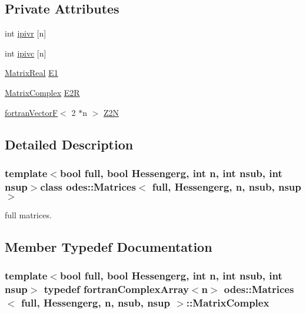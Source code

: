 \subsection*{Private Attributes}
\begin{DoxyCompactItemize}
\item 
int \hyperlink{classodes_1_1Matrices_ac7c747721a0d2ca7f9b792f25ce07ea9}{ipivr} \mbox{[}n\mbox{]}
\item 
int \hyperlink{classodes_1_1Matrices_a32b17a76a3380307a8fe5e6aa1395e4a}{ipivc} \mbox{[}n\mbox{]}
\item 
\hyperlink{classodes_1_1Matrices_aa028f1e52916558a51d333ac8b081030}{Matrix\+Real} \hyperlink{classodes_1_1Matrices_afba5034652d2298f7f8ad01468a1bdbd}{E1}
\item 
\hyperlink{classodes_1_1Matrices_aa1313b5ab7fdab6f5320c8d5aa3bfc24}{Matrix\+Complex} \hyperlink{classodes_1_1Matrices_a62ad6fe606146f2957ff8d428da1867d}{E2\+R}
\item 
\hyperlink{classodes_1_1fortranVectorF}{fortran\+Vector\+F}$<$ 2 $\ast$n $>$ \hyperlink{classodes_1_1Matrices_a812f56a1f3582a4c25271306644606f0}{Z2\+N}
\end{DoxyCompactItemize}


\subsection{Detailed Description}
\subsubsection*{template$<$bool full, bool Hessengerg, int n, int nsub, int nsup$>$class odes\+::\+Matrices$<$ full, Hessengerg, n, nsub, nsup $>$}

full matrices. 

\subsection{Member Typedef Documentation}
\hypertarget{classodes_1_1Matrices_aa1313b5ab7fdab6f5320c8d5aa3bfc24}{}
\subsubsection[{Matrix\+Complex}]{\setlength{\rightskip}{0pt plus 5cm}template$<$bool full, bool Hessengerg, int n, int nsub, int nsup$>$ typedef {\bf fortran\+Complex\+Array}$<$n$>$ {\bf odes\+::\+Matrices}$<$ full, Hessengerg, n, nsub, nsup $>$\+::{\bf Matrix\+Complex}}\label{classodes_1_1Matrices_aa1313b5ab7fdab6f5320c8d5aa3bfc24}
\hypertarget{classodes_1_1Matrices_aa028f1e52916558a51d333ac8b081030}{}
